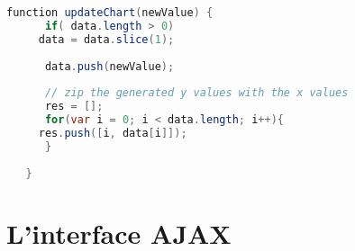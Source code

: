 \begin{DDbox}{\linewidth}
\begin{lstlisting}[language=java]
  function updateChart(newValue) {
      if( data.length > 0)
	 data = data.slice(1);
      
      data.push(newValue);
      
      // zip the generated y values with the x values
      res = [];
      for(var i = 0; i < data.length; i++){
	 res.push([i, data[i]]);
      }
      
   }
\end{lstlisting}
\end{DDbox}

\section{L'interface AJAX}

